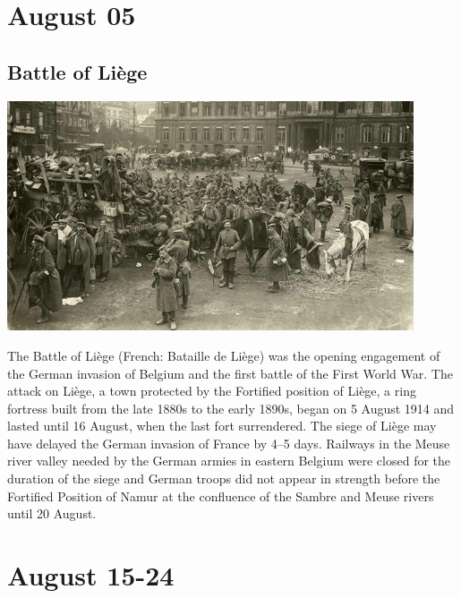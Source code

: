 \documentclass[11pt]{report}
\begin{document}
\section{August 05}
\subsection{Battle of Liège}
\vspace{2mm}\begin{center}\includegraphics[width=12cm]{./img/battleOfLiege.jpg}\end{center}
The Battle of Liège (French: Bataille de Liège) was the opening engagement of the German invasion of Belgium and the first battle of the First World War. The attack on Liège, a town protected by the Fortified position of Liège, a ring fortress built from the late 1880s to the early 1890s, began on 5 August 1914 and lasted until 16 August, when the last fort surrendered. The siege of Liège may have delayed the German invasion of France by 4–5 days. Railways in the Meuse river valley needed by the German armies in eastern Belgium were closed for the duration of the siege and German troops did not appear in strength before the Fortified Position of Namur at the confluence of the Sambre and Meuse rivers until 20 August.
\section{August 15-24}
\end{document}
